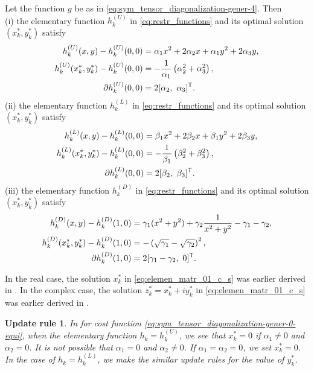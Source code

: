 \documentclass[final,onefignum,onetabnum]{siamart190516}
\newcommand{\T}{{\sf T}} %
\newtheorem{setting}[theorem]{Update rule}
\newcommand{\ui}{i}
\begin{document}
\begin{lemma}\label{lemm:elemen_express_c}
Let the function $g$ be as in \cref{eq:sym_tensor_diagonalization-gener-4}. Then\\
(i) the elementary function $h^{(U)}_{k}$ in \cref{eq:restr_functions} and its optimal solution $(x_k^*,y_k^*)$ satisfy
\begin{align}
h^{(U)}_{k}(x,y) - h^{(U)}_{k}(0,0) & = \alpha_{1}x^2 + 2\alpha_{2}x + \alpha_{1}y^2 + 2 \alpha_{3}y, \notag\\
h^{(U)}_{k}(x_k^*,y_k^*)-h^{(U)}_{k}(0,0)  & =  -\frac{1}{\alpha_{1}}\left(\alpha_{2}^2+\alpha_{3}^2\right), \label{eq:elemen_matr_01_c_s}\\
\partial h^{(U)}_{k}(0,0) 
& = 2[\alpha_{2},\  \alpha_{3}]^{\T}. \notag
\end{align}
(ii) the elementary function $h^{(L)}_k$ in \cref{eq:restr_functions} and its optimal solution $(x_k^*,y_k^*)$ satisfy 
\begin{align}
h^{(L)}_{k}(x,y) - h^{(L)}_{k}(0,0) 
& = \beta_{1}x^2 + 2\beta_{2}x + \beta_{1}y^2 + 2\beta_{3}y, \notag\\
h^{(L)}_{k}(x_k^*,y_k^*)-h^{(L)}_{k}(0,0) & = -\frac{1}{\beta_{1}}\left(\beta_{2}^2+\beta_{3}^2\right), \notag\\
\partial h^{(L)}_{k}(0,0) & = 2[\beta_{2},\ \beta_{3}]^{\T}. \notag
\end{align}
(iii) the elementary function $h^{(D)}_k$ in \cref{eq:restr_functions} and its optimal solution $(x_k^*,y_k^*)$ satisfy  
\begin{align}
h^{(D)}_{k}(x,y) - h^{(D)}_{k}(1,0) & = \gamma_{1}(x^2+y^2) + \gamma_{2}\frac{1}{x^2+y^2} -\gamma_{1} - \gamma_{2},\notag\\
h^{(D)}_{k}(x_k^*,y_k^*) - h^{(D)}_{k}(1,0)
& = -\left(\sqrt{\gamma_{1}}-\sqrt{\gamma_{2}}\right)^2,\notag\\
\partial h^{(D)}_{k}(1,0) & = 2[\gamma_{1} - \gamma_{2},\ 0]^{\T} .\notag
\end{align}
\end{lemma}

\begin{remark}
In the real case,
the solution $x_k^{*}$ in \cref{eq:elemen_matr_01_c_s} was earlier derived in \cite[Eq. (7)]{afsari2006simple}.
In the complex case,
the solution $z_k^{*}=x_k^{*}+\ui y_k^{*}$ in \cref{eq:elemen_matr_01_c_s} was earlier derived in 
\cite[Eq. (8)]{wang2012complex}.
\end{remark}


\begin{setting}\label{remar:rho_setting_four_case_ul}
In  for cost function \cref{eq:sym_tensor_diagonalization-gener-0-equi},
when the elementary function $h_k=h^{(U)}_{k}$,
we see that $x_{k}^{*}=0$ if $\alpha_{1}\neq0$ and $\alpha_{2}=0$. 
It is not possible that $\alpha_{1}=0$ and $\alpha_{2}\neq0$. 
If $\alpha_{1}=\alpha_{2}=0$, we set $x_{k}^{*}=0$. 
In the case of $h_k=h^{(L)}_{k}$,
we make the similar update rules for the value of $y_{k}^{*}$. 
\end{setting}
\end{document}
